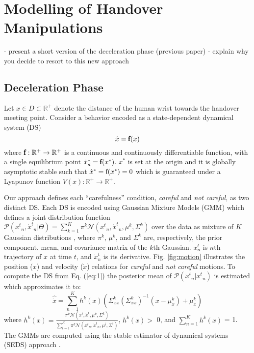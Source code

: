 \section{Modelling of Handover Manipulations}

- present a short version of the deceleration phase (previous paper)
- explain why you decide to resort to this new approach

\subsection{Deceleration Phase}

Let $x \in D \subset \mathbb{R}^{+}$ denote the distance of the human wrist towards the handover meeting point. Consider a behavior encoded as a state-dependent dynamical system (DS)
%
\begin{equation}
\dot{x} = \pmb{\textnormal{f}}(x)
\label{eq:1}
\end{equation}
where $\pmb{\textnormal{f}}:\mathbb{R}^{+} \to \mathbb{R}^{+}$ is a continuous and continuously differentiable function, with a single equilibrium point ${\dot{x}_d}^* = \pmb{\textnormal{f}}(x^*)$. $x^{*}$ is set at the origin and it is globally asymptotic stable such that $\dot{x}^* = \textnormal{f}(x^{*}) = 0$ which is guaranteed under a Lyapunov function $V(x):\mathbb{R}^{+} \rightarrow \mathbb{R}^{+}$.

Our approach defines each ``carefulness'' condition, \textit{careful} and \textit{not careful}, as two distinct DS. Each DS is encoded using Gaussian Mixture Models (GMM) which defines a joint distribution function $\mathcal{P}({{x}^{t}}_n, {\dot{x}^{t}}_n | \Theta) = \sum_{k=1}^{K} \pi^{k} \mathcal{N}({{x}^{t}}_n, {\dot{x}^{t}}_n, \mu^{k}, \Sigma^{k})$ over the data as mixture of $K$ Gaussian distributions \cite{khansari2011learning}, where $\pi^{k}$, $\mu^{k}$, and $\Sigma^{k}$ are, respectively, the prior component, mean, and covariance matrix of the $k$th Gaussian. $x_n^t$ is $n$th trajectory of $x$ at time $t$, and $\dot{x}_n^t$ is its derivative. Fig. \ref{fig:motion} illustrates the position ($x$) and velocity ($\dot{x}$) relations for \textit{careful} and \textit{not careful} motions. To compute the DS from Eq. (\ref{eq:1}) the posterior mean of $\mathcal{P}({\dot{x}^{t}}_n|{{x}^{t}}_n)$ is estimated which approximates it to:
%
\begin{equation}
\hat{\dot{x}} = \sum_{n=1}^{K} h^{k}(x) (\Sigma^{k}_{\dot{x}x}(\Sigma^{k}_{xx})^{-1} (x - \mu^{k}_{x}) + \mu^{k}_{\dot{x}})
\label{eq:2}
\end{equation}
where $h^{k}(x) = \frac{\pi^{k} \mathcal{N}({{x}^{t}}, {\dot{x}^{t}}, \mu^{k}, \Sigma^{k})}{\sum_{i=1}^{K} \pi^{k} \mathcal{N}({{x}^{t}}_n, {\dot{x}^{t}}_n, \mu^{i}, \Sigma^{i})}$, $h^{k}(x) > $ 0, and $\sum_{n=1}^{K} h^{k}(x)$ = 1. The GMMs are computed using the stable estimator of dynamical systems (SEDS) approach \cite{khansari2011learning}. 

